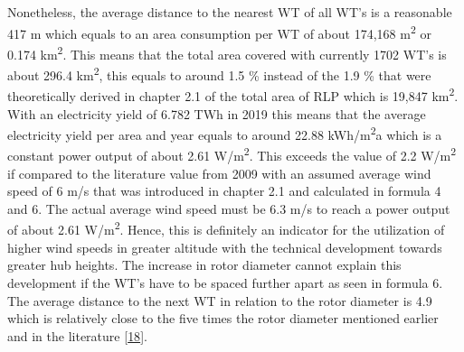 \documentclass[a4paper,11pt]{article}
\begin{document}
Nonetheless, the average distance to the nearest WT of all WT's is a reasonable 417 m which equals to an area consumption per WT of about 174,168 m\textsuperscript{2} or 0.174 km\textsuperscript{2}. This means that the total area covered with currently 1702 WT's is about 296.4 km\textsuperscript{2}, this equals to around 1.5 \% instead of the 1.9 \% that were theoretically derived in chapter 2.1 of the total area of RLP which is 19,847 km\textsuperscript{2}. With an electricity yield of 6.782 TWh in 2019 this means that the average electricity yield per area and year equals to around 22.88 kWh/m\textsuperscript{2}a which is a constant power output of about 2.61 W/m\textsuperscript{2}. This exceeds the value of 2.2 W/m\textsuperscript{2} if compared to the literature value from 2009 with an assumed average wind speed of 6 m/s that was introduced in chapter 2.1 and calculated in formula 4 and 6. The actual average wind speed must be 6.3 m/s to reach a power output of about 2.61 W/m\textsuperscript{2}. Hence, this is definitely an indicator for the utilization of higher wind speeds in greater altitude with the technical development towards greater hub heights. The increase in rotor diameter cannot explain this development if the WT's have to be spaced further apart as seen in formula 6. The average distance to the next WT in relation to the rotor diameter is 4.9 which is relatively close to the five times the rotor diameter mentioned earlier and in the literature {[}\protect\hyperlink{ref-DavidJCMacKay.2009}{18}{]}.
\end{document}
